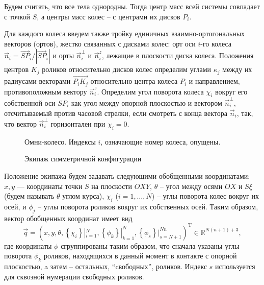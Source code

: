 Будем считать, что все тела однородны. Тогда центр масс всей системы совпадает с точкой $S$, а центры масс колес -- с центрами их дисков $P_i$.

Для каждого колеса введем также тройку единичных взаимно-ортогональных векторов (ортов), жестко связанных с дисками колес: орт оси $i$-го колеса $\vec{n}_i = \vec{SP}_i/|\vec{SP}_i|$ и орты $\vec{n}_i^\perp$ и $\vec{n}_i^z$, лежащие в плоскости диска колеса. Положения центров $K_j$ роликов относительно дисков колес определим углами $\kappa_j$ между их радиусами-векторами $\overrightarrow{P_iK_j}$ относительно центра колеса $P_i$ и направлением, противоположным вектору $\vec{n}_i^z$. Определим угол поворота колеса $\chi_i$ вокруг его собственной оси $SP_i$ как угол между опорной плоскостью и вектором $\vec{n}_i^\perp$, отсчитываемый против часовой стрелки, если смотреть с конца вектора $\vec{n}_i$, так, что вектор $\vec{n}_i^\perp$ горизонтален при $\chi_i = 0$.

\begin{figure}[htb]
    \centering
        \centering
        \caption{Омни-колесо. Индексы $i$, означающие номер колеса, опущены.}
        \label{fig:wheel}
    \endminipage
    \quad
        \centering
        \caption{Экипаж симметричной конфигурации}
        \label{fig:vehicle}
    \endminipage
\end{figure}

Положение экипажа будем задавать следующими обобщенными координатами:
$x, y$ --- координаты точки $S$ на плоскости $OXY$, $\theta$ -- угол между осями $OX$ и $S\xi$ (будем называть $\theta$ углом курса),
$\chi_i$ ($i = 1,\dots,N$) -- углы поворота колес вокруг их осей, и $\phi_j$ -- углы поворота роликов вокруг их собственных осей.
Таким образом, вектор обобщенных координат имеет вид
\begin{equation}\label{eq:q}
    \vec{q} = (
        x, y, \theta,
        \left\{\chi_i\right\}|_{i=1}^N,
        \left\{\phi_k\right\}|_{k=1}^N,
        \left\{\phi_s\right\}|_{s=N + 1}^{Nn}
    )^{\mathop{T}}\in\mathbb{R}^{N(n+1) + 3},    
\end{equation}
где координаты $\phi$ сгруппированы таким образом, что сначала указаны углы поворота $\phi_k$ роликов, находящихся в данный момент в контакте с опорной плоскостью, a затем -- остальных, ``cвободных'', роликов. Индекс $s$ используется для сквозной нумерации свободных роликов.


